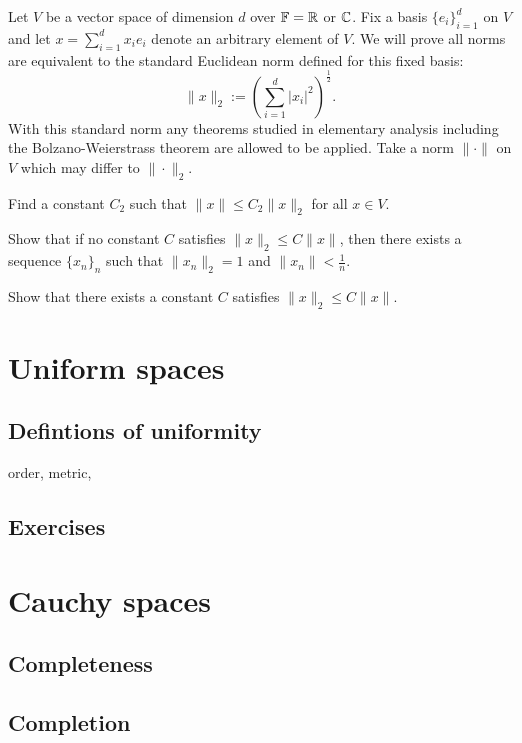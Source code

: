 \documentclass{../note}
\begin{document}
\begin{prb}
Let $V$ be a vector space of dimension $d$ over $\mathbb{F}=\mathbb{R}$ or $\mathbb{C}$.
Fix a basis $\{e_i\}_{i=1}^d$ on $V$ and let $x=\sum_{i=1}^dx_ie_i$ denote an arbitrary element of $V$.
We will prove all norms are equivalent to the standard Euclidean norm defined for this fixed basis:
\[\|x\|_2:=(\sum_{i=1}^d|x_i|^2)^{\frac12}.\]
With this standard norm any theorems studied in elementary analysis including the Bolzano-Weierstrass theorem are allowed to be applied.
Take a norm $\|\cdot\|$ on $V$ which may differ to $\|\cdot\|_2$.
\begin{parts}
\item Find a constant $C_2$ such that $\|x\|\le C_2\|x\|_2$ for all $x\in V$.
\item Show that if no constant $C$ satisfies $\|x\|_2\le C\|x\|$, then there exists a sequence $\{x_n\}_n$ such that $\|x_n\|_2=1$ and $\|x_n\|<\tfrac1n$.
\item Show that there exists a constant $C$ satisfies $\|x\|_2\le C\|x\|$.
\end{parts}
\end{prb}






\chapter{Uniform spaces}

\section{Defintions of uniformity}

order, metric,



\section*{Exercises}







\chapter{Cauchy spaces}
\section{Completeness}
\section{Completion}
\end{document}
